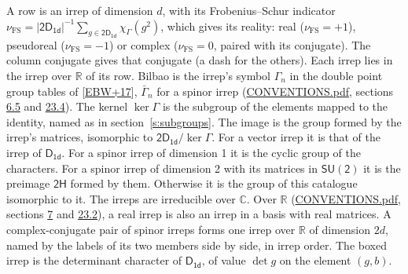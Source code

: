 \documentclass[10pt,a4paper]{article}
\numberwithin{equation}{section}
\newcommand{\grp}[1]{\mathsf{#1}}
\newcommand{\irchar}[1]{\chi_{#1}}
\newcommand{\fsind}{\nu_{\mathrm{FS}}}
\begin{document}
\leavevmode\label{n:index.frobenius}\label{n:head.irrep}\label{n:head.reality}A row is an irrep of dimension $d$, with its Frobenius--Schur indicator $\fsind = |\grp{2D_{1d}}|^{-1}\allowbreak\sum_{g\in\grp{2D_{1d}}}\irchar{\Gamma}(g^2)$, which gives its reality: real ($\fsind = +1$), pseudoreal ($\fsind = -1$) or complex ($\fsind = 0$, paired with its conjugate). \label{n:head.conjugate}The column conjugate gives that conjugate (a dash for the others). \label{n:head.over.real}Each irrep lies in the irrep over $\mathbb{R}$ of its row. \label{n:head.bilbao}\label{n:irrep.alias.gamma}Bilbao is the irrep's symbol $\Gamma_n$ in the double point group tables of [\href{../../../REFERENCES.pdf\#ref.EBW+17}{EBW+17}], $\bar{\Gamma}_n$ for a spinor irrep (\href{../../CONVENTIONS.pdf}{CONVENTIONS.pdf}, sections \href{../../../rotation/CONVENTIONS.pdf\#conv.6.5}{6.5} and \href{../../CONVENTIONS.pdf\#conv.23.4}{23.4}). \label{n:head.kernel}The kernel $\ker\Gamma$ is the subgroup of the elements mapped to the identity, named as in section~\ref{s:subgroups}. \label{n:head.image}The image is the group formed by the irrep's matrices, isomorphic to $\grp{2D_{1d}}/\ker\Gamma$. For a vector irrep it is that of the irrep of \href{../../../rotation/data/pdf/D1d.pdf}{$\grp{D_{1d}}$}. For a spinor irrep of dimension 1 it is the cyclic group of the characters. For a spinor irrep of dimension 2 with its matrices in $\grp{SU(2)}$ it is the preimage $\grp{2H}$ formed by them. Otherwise it is the group of this catalogue isomorphic to it. The irreps are irreducible over $\mathbb{C}$. Over $\mathbb{R}$ (\href{../../CONVENTIONS.pdf}{CONVENTIONS.pdf}, sections \href{../../../rotation/CONVENTIONS.pdf\#conv.7}{7} and \href{../../CONVENTIONS.pdf\#conv.23.2}{23.2}), a real irrep is also an irrep in a basis with real matrices. A complex-conjugate pair of spinor irreps forms one irrep over $\mathbb{R}$ of dimension $2d$, named by the labels of its two members side by side, in irrep order. \label{n:mark.determinant}The boxed irrep is the determinant character of \href{../../../rotation/data/pdf/D1d.pdf}{$\grp{D_{1d}}$}, of value $\det g$ on the element $(g, b)$.
\setlength{\emergencystretch}{2em}\par\setlength{\emergencystretch}{0pt}
\end{document}
